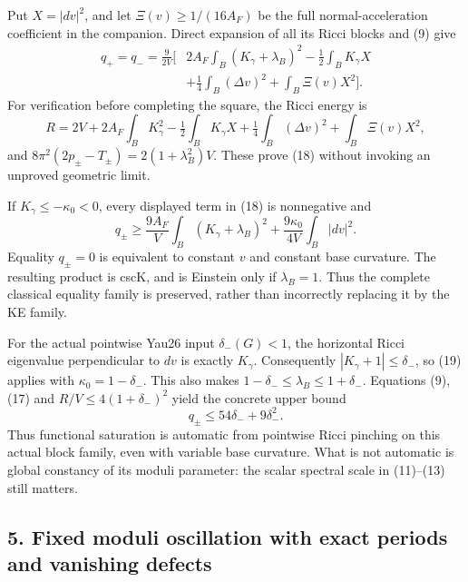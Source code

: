 \documentclass[
  11pt,
]{article}
\begin{document}
Put \(X=|dv|^2\), and let \(\Xi(v)\ge1/(16A_F)\) be the full
normal-acceleration coefficient in the companion. Direct expansion of
all its Ricci blocks and (9) give \[
 \boxed{\begin{aligned}
 q_+=q_-=\frac9{2V}\bigg[&2A_F\int_B(K_\gamma+\lambda_B)^2
       -\frac12\int_B K_\gamma X\\
       &+\frac14\int_B(\Delta v)^2+\int_B\Xi(v)X^2\bigg].
 \end{aligned}}                                               \tag{18}
\] For verification before completing the square, the Ricci energy is \[
 R=2V+2A_F\int_BK_\gamma^2-\tfrac12\int_BK_\gamma X
                 +\tfrac14\int_B(\Delta v)^2+\int_B\Xi(v)X^2,
\] and \(8\pi^2(2p_\pm-T_\pm)=2(1+\lambda_B^2)V\). These prove (18)
without invoking an unproved geometric limit.

If \(K_\gamma\le-\kappa_0<0\), every displayed term in (18) is
nonnegative and \[
 q_\pm\ge\frac{9A_F}{V}\int_B(K_\gamma+\lambda_B)^2
                       +\frac{9\kappa_0}{4V}\int_B|dv|^2.
                                                               \tag{19}
\] Equality \(q_\pm=0\) is equivalent to constant \(v\) and constant
base curvature. The resulting product is cscK, and is Einstein only if
\(\lambda_B=1\). Thus the complete classical equality family is
preserved, rather than incorrectly replacing it by the KE family.

For the actual pointwise Yau26 input \(\delta_-(G)<1\), the horizontal
Ricci eigenvalue perpendicular to \(dv\) is exactly \(K_\gamma\).
Consequently \(|K_\gamma+1|\le\delta_-\), so (19) applies with
\(\kappa_0=1-\delta_-\). This also makes
\(1-\delta_-\le\lambda_B\le1+\delta_-\). Equations (9),(17) and
\(R/V\le4(1+\delta_-)^2\) yield the concrete upper bound \[
                       q_\pm\le54\delta_-+9\delta_-^2.         \tag{20}
\] Thus functional saturation is automatic from pointwise Ricci pinching
on this actual block family, even with variable base curvature. What is
not automatic is global constancy of its moduli parameter: the scalar
spectral scale in (11)--(13) still matters.

\hypertarget{fixed-moduli-oscillation-with-exact-periods-and-vanishing-defects}{%
\subsection{5. Fixed moduli oscillation with exact periods and vanishing
defects}\label{fixed-moduli-oscillation-with-exact-periods-and-vanishing-defects}}
\end{document}
